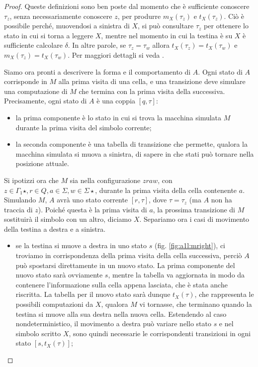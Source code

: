 \begin{proof}
	Queste definizioni sono ben poste dal momento che è sufficiente conoscere $\tau_z$, senza necessariamente conoscere $z$, per produrre $m_X(\tau_z)$ e $t_X(\tau_z)$. Ciò è possibile perché, muovendosi a sinistra di $X$, si può consultare $\tau_z$ per ottenere lo stato in cui si torna a leggere $X$, mentre nel momento in cui la testina è su $X$ è sufficiente calcolare $\delta$. In altre parole, se $\tau_z=\tau_w$ allora $t_X(\tau_z)=t_X(\tau_w)$ e $m_X(\tau_z)=t_X(\tau_w)$. Per maggiori dettagli si veda \cite{Pighizzini:14:limitedRE}.

	Siamo ora pronti a descrivere la forma e il comportamento di $A$.
	Ogni stato di $A$ corrisponde in $M$ alla prima visita di una cella, e una transizione deve simulare una computazione di $M$ che termina con la prima visita della successiva. Precisamente, ogni stato di $A$ è una coppia $[q,\tau]$:
	\begin{itemize}
		\item la prima componente è lo stato in cui si trova la macchina simulata $M$ durante la prima visita del simbolo corrente;
		\item la seconda componente è una tabella di transizione che permette, qualora la macchina simulata si muova a sinistra, di sapere in che stati può tornare nella posizione attuale.
	\end{itemize}
	Si ipotizzi ora che $M$ sia nella configurazione $zraw$, con $z\in\Gamma_1\star,r\in Q,a\in\Sigma,w\in\Sigma\star$, durante la prima visita della cella contenente $a$. Simulando $M$, $A$ avrà uno stato corrente $[r,\tau]$, dove $\tau=\tau_z$ (ma $A$ non ha traccia di $z$). Poiché questa è la prima visita di $a$, la prossima transizione di $M$ sostituirà il simbolo con un altro, diciamo $X$. Separiamo ora i casi di movimento della testina a destra e a sinistra.
	\begin{itemize}
		\item se la testina si muove a destra in uno stato $s$ (fig. \ref{fig:a1l:mright}), ci troviamo in corrispondenza della prima visita della cella successiva, perciò $A$ può spostarsi direttamente in un nuovo stato. La prima componente del nuovo stato sarà ovviamente $s$, mentre la tabella va aggiornata in modo da contenere l'informazione sulla cella appena lasciata, che è stata anche riscritta. La tabella per il nuovo stato sarà dunque $t_X(\tau)$, che rappresenta le possibili computazioni da $X$, qualora $M$ vi tornasse, che terminano quando la testina si muove alla sua destra nella nuova cella. Estendendo al caso nondeterministico, il movimento a destra può variare nello stato $s$ e nel simbolo scritto $X$, sono quindi necessarie le corrispondenti transizioni in ogni stato $[s,t_X(\tau)]$;

\end{itemize}
\end{proof}
